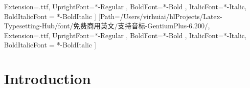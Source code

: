 \documentclass[a4paper,landscape]{book}
\begin{document}
\newcommand\counterSetTmpOpen{\providecommand{\counterSetTmp}{}\renewcommand\counterSetTmp[2]{\setcounter{##1}{##2}}}
\newcommand\counterSetTmpClose{\providecommand{\counterSetTmp}{}\renewcommand\counterSetTmp[2]{}}
\counterSetTmpOpen



Extension=.ttf,
UprightFont=*-Regular ,
BoldFont=*-Bold ,
ItalicFont=*-Italic,
BoldItalicFont = *-BoldItalic
]
\newfontfamily{}[Path=/Users/virhuiai/hlProjects/Latex-Typesetting-Hub/font/免费商用英文/支持音标-GentiumPlus-6.200/,
Extension=.ttf,
UprightFont=*-Regular ,
BoldFont=*-Bold ,
ItalicFont=*-Italic,
BoldItalicFont = *-BoldItalic
]

\newcommand{\csh一音标}[2]{%
\tikzmarknode{#1\thecsh一音标一计数器}{\MakeLowercase{#1}\xspace}%
\begin{tikzpicture}[remember picture,overlay]%
\node [red,anchor=south west] at ([yshift=-0.45em] #1\thecsh一音标一计数器.north west) {\hspace{-1ex}\small\fontGentiumPlus#2};
\end{tikzpicture}\stepcounter{csh一音标一计数器}}

\newcommand\parcolumnsLeft{0.4\textwidth}

\chapter{Introduction}
%  
\end{document}
